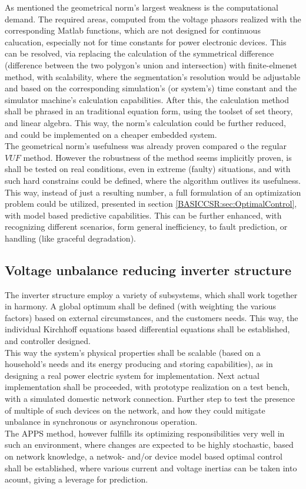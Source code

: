 		As mentioned the geometrical norm's largest weakness is the computational demand. The required areas, computed from the voltage phasors realized with the corresponding Matlab functions, which are not designed for continuous calucation, especially not for time constants for power electronic devices. This can be resolved, via replacing the calculation of the symmetrical difference (difference between the two polygon's union and intersection) with finite-elmenet method, with scalability, where the segmentation's resolution would be adjustable and based on the corresponding simulation's (or system's) time constant and the simulator machine's calculation capabilities. After this, the calculation method shall be phrased in an traditional equation form, using the toolset of set theory, and linear algebra. This way, the norm's calculation could be further reduced, and could be implemented on a cheaper embedded system.\\
		The geometrical norm's usefulness was already proven compared o the regular $VUF$ method. However the robustness of the method seems implicitly proven, is shall be tested on real conditions, even in extreme (faulty) situations, and with such hard constrains could be defined, where the algorithm outlives its usefulness. This way, instead of just a resulting number, a full formulation of an optimization problem could be utilized, presented in section \ref{BASICCSR:sec:OptimalControl}, with model based predictive capabilities. This can be further enhanced, with recognizing different scenarios, form general inefficiency, to fault prediction, or handling (like graceful degradation).
		
		\subsection{Voltage unbalance reducing inverter structure}
		
		The inverter structure employ a variety of subsystems, which shall work together in harmony. A global optimum shall be defined (with weighting the various factors) based on external circumstances, and the customers needs. This way, the individual Kirchhoff equations based differential equations shall be established, and controller designed.\\
		This way the system's physical properties shall be scalable (based on a household's needs and its energy producing and storing capabilities), as in designing a real power electric system for implementation. Next actual implementation shall be proceeded, with prototype realization on a test bench, with a simulated domestic network connection. Further step to test the presence of multiple of such devices on the network, and how they could mitigate unbalance in synchronous or asynchronous operation. \\
		The APPS method, however fulfills its optimizing responsibilities very well in such an environment, where changes are expected to be highly stochastic, based on network knowledge, a netwok- and/or device model based optimal control shall be established, where various current and voltage inertias can be taken into acount, giving a leverage for prediction. 
		
